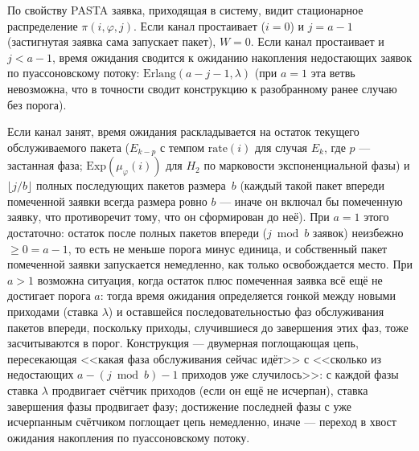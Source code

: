 \documentclass[12pt,a4paper]{article}
\begin{document}
\begin{center}
{}
\label{fig:ctmc-diagram}
\end{center}

По свойству PASTA заявка, приходящая в систему, видит стационарное распределение $\pi(i,\varphi,j)$. Если канал простаивает ($i=0$) и $j=a-1$ (застигнутая заявка сама запускает пакет), $W=0$. Если канал простаивает и $j<a-1$, время ожидания сводится к ожиданию накопления недостающих заявок по пуассоновскому потоку: $\mathrm{Erlang}(a-j-1,\lambda)$ (при $a=1$ эта ветвь невозможна, что в точности сводит конструкцию к разобранному ранее случаю без порога).

Если канал занят, время ожидания раскладывается на остаток текущего обслуживаемого пакета ($E_{k-p}$ с темпом $\mathrm{rate}(i)$ для случая $E_k$, где $p$ --- застанная фаза; $\mathrm{Exp}(\mu_\varphi(i))$ для $H_2$ по марковости экспоненциальной фазы) и $\lfloor j/b\rfloor$ полных последующих пакетов размера~$b$ (каждый такой пакет впереди помеченной заявки всегда размера ровно $b$ --- иначе он включал бы помеченную заявку, что противоречит тому, что он сформирован до неё). При $a=1$ этого достаточно: остаток после полных пакетов впереди ($j\bmod b$ заявок) неизбежно $\ge0=a-1$, то есть не меньше порога минус единица, и собственный пакет помеченной заявки запускается немедленно, как только освобождается место. При $a>1$ возможна ситуация, когда остаток плюс помеченная заявка всё ещё не достигает порога $a$: тогда время ожидания определяется гонкой между новыми приходами (ставка $\lambda$) и оставшейся последовательностью фаз обслуживания пакетов впереди, поскольку приходы, случившиеся до завершения этих фаз, тоже засчитываются в порог. Конструкция --- двумерная поглощающая цепь, пересекающая <<какая фаза обслуживания сейчас идёт>> с <<сколько из недостающих $a-(j\bmod b)-1$ приходов уже случилось>>: с каждой фазы ставка $\lambda$ продвигает счётчик приходов (если он ещё не исчерпан), ставка завершения фазы продвигает фазу; достижение последней фазы с уже исчерпанным счётчиком поглощает цепь немедленно, иначе --- переход в хвост ожидания накопления по пуассоновскому потоку.
\end{document}
